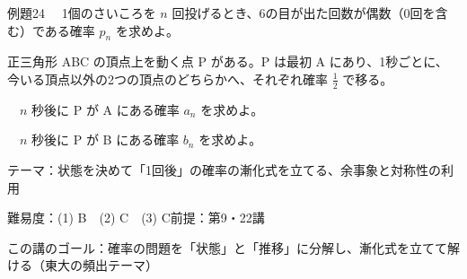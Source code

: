 \documentclass[paper=b5j, fontsize=8pt, fleqn, twoside]{jlreq}
\begin{document}
\begin{ascolorbox4A}[出典：オリジナル]{例題24}
  　1個のさいころを $n$ 回投げるとき、6の目が出た回数が偶数（0回を含む）である確率 $p_n$ を求めよ。\par
  正三角形 ABC の頂点上を動く点 P がある。P は最初 A にあり、1秒ごとに、今いる頂点以外の2つの頂点のどちらかへ、それぞれ確率 $\frac12$ で移る。\par
  　$n$ 秒後に P が A にある確率 $a_n$ を求めよ。\par
  　$n$ 秒後に P が B にある確率 $b_n$ を求めよ。
\end{ascolorbox4A}

\begin{Data}
  テーマ：状態を決めて「1回後」の確率の漸化式を立てる、余事象と対称性の利用\par
  難易度：(1) B　(2) C　(3) C\quad 前提：第9・22講\par
  この講のゴール：確率の問題を「状態」と「推移」に分解し、漸化式を立てて解ける（東大の頻出テーマ）
\end{Data}
\end{document}
